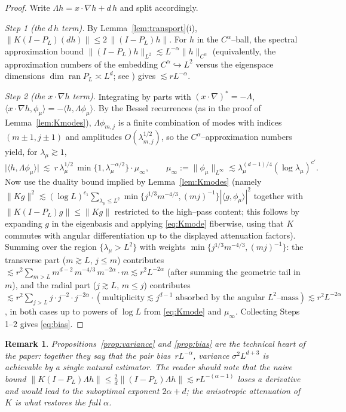 \documentclass[11pt]{article}
\newtheorem{remark}[theorem]{Remark}
\newcommand{\1}{\mathbf{1}}
\newcommand{\norm}[1]{\lVert #1\rVert}
\newcommand{\inner}[2]{\langle #1,#2\rangle}
\begin{document}
\begin{proof}[Proof]
Write $\Lambda h=x\cdot\nabla h+d\,h$ and split accordingly.

\emph{Step 1 (the $d\,h$ term).} By Lemma~\ref{lem:transport}(i),
$\norm{K(I-P_L)(d h)}\le 2\,\norm{(I-P_L)h}$. For $h$ in the $C^\alpha$--ball, the
spectral approximation bound
$\norm{(I-P_L)h}_{L^2}\lesssim L^{-\alpha}\norm h_{C^\alpha}$
(equivalently, the approximation numbers of the embedding
$C^\alpha\hookrightarrow L^2$ versus the eigenspace dimensions
$\dim\operatorname{ran}P_L\asymp L^d$; see \cite{Triebel}) gives
$\lesssim rL^{-\alpha}$.

\emph{Step 2 (the $x\cdot\nabla h$ term).} Integrating by parts with
$(x\cdot\nabla)^*=-\Lambda$,
$\inner{x\cdot\nabla h}{\phi_\mu}=-\inner{h}{\Lambda\phi_\mu}$.
By the Bessel recurrences (as in the proof of Lemma~\ref{lem:Kmodes}),
$\Lambda\phi_{m,j}$ is a finite combination of modes with indices
$(m\pm1,j\pm1)$ and amplitudes $O(\lambda_{m,j}^{1/2})$, so the
$C^\alpha$--approximation numbers yield, for $\lambda_\mu\gtrsim1$,
\[
\big|\inner{h}{\Lambda\phi_\mu}\big|
\ \lesssim\ r\,\lambda_\mu^{1/2}\,\min\{1,\lambda_\mu^{-\alpha/2}\}\cdot \mu_\infty,
\qquad \mu_\infty:=\norm{\phi_\mu}_{L^\infty}\lesssim \lambda_\mu^{(d-1)/4}(\log\lambda_\mu)^{c'}.
\]
Now use the duality bound implied by Lemma~\ref{lem:Kmodes} (namely
$\norm{Kg}^2\lesssim(\log L)^{c_1}\sum_{\lambda_\mu\le L^2}\min\{j^{1/3}m^{-4/3},(mj)^{-1}\}
|\inner{g}{\phi_\mu}|^2$ together with
$\norm{K(I-P_L)g}\le\norm{Kg}$ restricted to the high--pass content; this follows
by expanding $g$ in the eigenbasis and applying \eqref{eq:Kmode} fiberwise, using that
$K$ commutes with angular differentiation up to the displayed attenuation factors).
Summing over the region $\{\lambda_\mu>L^2\}$ with weights
$\min\{j^{1/3}m^{-4/3},(mj)^{-1}\}$: the transverse part
($m\gtrsim L$, $j\le m$) contributes
$\lesssim r^2\sum_{m>L}m^{d-2}\,m^{-4/3}\,m^{-2\alpha}\cdot m\lesssim r^2L^{-2\alpha}$
(after summing the geometric tail in $m$), and the radial part
($j\gtrsim L$, $m\le j$) contributes
$\lesssim r^2\sum_{j>L}j\cdot j^{-2}\cdot j^{-2\alpha}\cdot(\text{multiplicity}\lesssim j^{d-1}
\text{ absorbed by the angular }L^2\text{--mass})\lesssim r^2L^{-2\alpha}$,
in both cases up to powers of $\log L$ from \eqref{eq:Kmode} and
$\mu_\infty$. Collecting Steps 1--2 gives \eqref{eq:bias}.
\end{proof}

\begin{remark}
Propositions~\ref{prop:variance} and \ref{prop:bias} are the technical heart of the
paper: together they say that the pair \emph{bias $\,rL^{-\alpha}$, variance
$\sigma^2L^{d+3}$} is achievable by a single natural estimator. The reader should note
that the naive bound $\norm{K(I-P_L)\Lambda h}\le\frac2d\norm{(I-P_L)\Lambda h}
\lesssim rL^{-(\alpha-1)}$ \emph{loses a derivative} and would lead to the suboptimal
exponent $2\alpha+d$; the anisotropic attenuation of $K$ is what restores the full
$\alpha$.
\end{remark}
\end{document}
